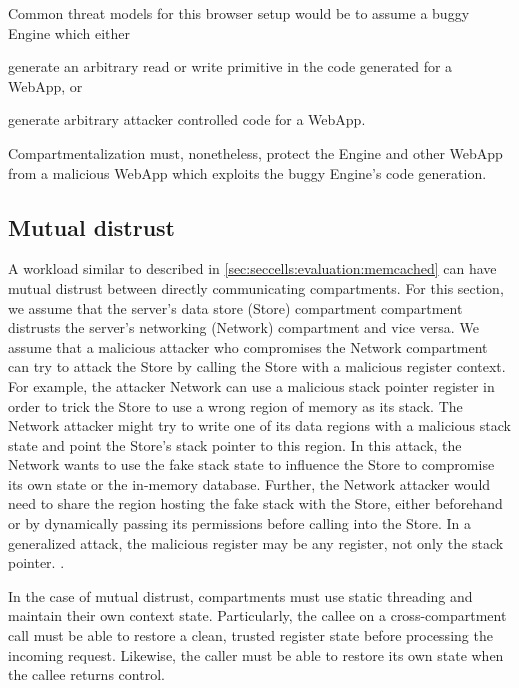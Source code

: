 Common threat models for this browser setup would be to assume a buggy Engine
which either
\begin{inparaenum}
      \item generate an arbitrary read or write primitive in the code generated
            for a WebApp, or 
      \item generate arbitrary attacker controlled code for a WebApp.
\end{inparaenum}
Compartmentalization must, nonetheless, protect the Engine and other WebApp 
from a malicious WebApp which exploits the buggy Engine's code generation.

\subsection{Mutual distrust} 
\label{sec:compreview:usecases:distrust}
A workload similar to  described in 
\autoref{sec:seccells:evaluation:memcached} can have mutual distrust
between directly communicating compartments.
For this section, we assume that the server's data store (Store) compartment
compartment distrusts the server's networking (Network) compartment and
vice versa.
We assume that a malicious attacker who compromises the Network compartment
can try to attack the Store by calling the Store with a malicious register
context.
For example, the attacker Network can use a malicious stack pointer register 
in order to trick the Store to use a wrong region of memory as its stack.
The Network attacker might try to write one of its data regions with a malicious
stack state and point the Store's stack pointer to this region.
In this attack, the Network wants to use the fake stack state to influence the
Store to compromise its own state or the in-memory database.
Further, the Network attacker would need to share the region hosting the fake
stack with the Store, either beforehand or by dynamically passing its 
permissions before calling into the Store.
In a generalized attack, the malicious register may be any register, not
only the stack pointer.
.

In the case of mutual distrust, compartments must use static threading 
and maintain their own context state.
Particularly, the callee on a cross-compartment call must be able to 
restore a clean, trusted register state before processing the incoming request.
Likewise, the caller must be able to restore its own state when the callee
returns control.

